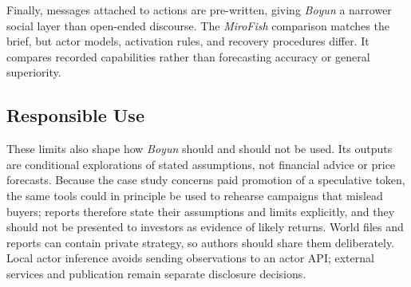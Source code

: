 Finally, messages attached to actions are pre-written, giving \textit{Boyun}
a narrower social layer than open-ended discourse. The \textit{MiroFish}
comparison matches the brief, but actor models, activation rules, and recovery
procedures differ. It compares recorded capabilities rather than forecasting
accuracy or general superiority.

\subsection{Responsible Use}
These limits also shape how \textit{Boyun} should and should not be used.
Its outputs are conditional explorations of stated assumptions, not
financial advice or price forecasts. Because the case study concerns paid
promotion of a speculative token, the same tools could in principle be used to
rehearse campaigns that mislead buyers; reports therefore state their
assumptions and limits explicitly, and they should not be presented to
investors as evidence of likely returns. World files and reports can contain
private strategy, so authors should share them deliberately. Local actor
inference avoids sending observations to an actor API; external services and
publication remain separate disclosure decisions.
